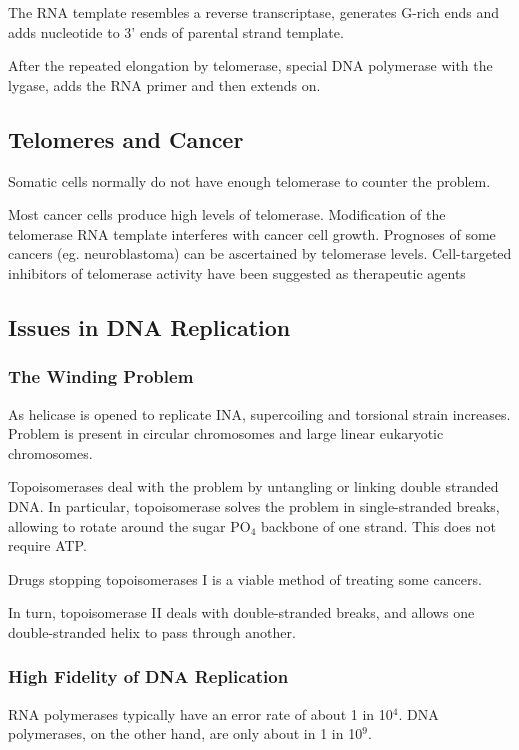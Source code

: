 \documentclass[11pt]{scrartcl}
\begin{document}
The RNA template resembles a reverse transcriptase, generates G-rich
ends and adds nucleotide to 3' ends of parental strand template.

After the repeated  elongation by telomerase, special DNA polymerase
with the lygase, adds the RNA primer and then extends on.

\subsection{Telomeres and Cancer}

Somatic cells normally do not have enough telomerase to counter the
problem.

Most cancer cells produce high levels of telomerase. Modification of
the telomerase RNA template interferes with cancer cell
growth. Prognoses of some cancers (eg. neuroblastoma) can be
ascertained by telomerase levels. Cell-targeted inhibitors of
telomerase activity have been suggested as therapeutic agents

\subsection{Issues in DNA Replication}

\subsubsection{The Winding Problem}

  As helicase is opened to replicate INA, supercoiling and torsional strain increases.
  Problem is present in circular chromosomes and large linear eukaryotic chromosomes.

  Topoisomerases deal with the problem by untangling or linking double stranded DNA. In particular, topoisomerase solves the problem in single-stranded breaks, allowing to rotate around the sugar PO$_4$ backbone of one strand. This does not require ATP.

  Drugs stopping topoisomerases I is a viable method of treating some cancers.

  In turn, topoisomerase II deals with double-stranded breaks, and allows one double-stranded helix to pass through another.

\subsubsection{High Fidelity of DNA Replication}

  RNA polymerases typically have an error rate of about 1 in
  10$^4$. DNA polymerases, on the other hand, are only about in 1 in
  10$^9$.
\end{document}
